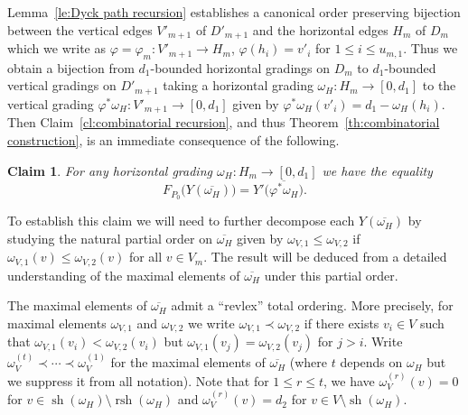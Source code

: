\documentclass{amsart}
\newtheorem{claim}[theorem]{Claim}
\newcommand{\rsh}{\operatorname{rsh}}
\newcommand{\sh}{\operatorname{sh}}
\begin{document}
Lemma~\ref{le:Dyck path recursion} establishes a canonical order preserving bijection between the vertical edges $V'_{m+1}$ of $D'_{m+1}$ and the horizontal edges $H_m$ of $D_m$ which we write as $\varphi=\varphi_m:V'_{m+1}\to H_m$, $\varphi(h_i)=v'_i$ for $1\le i\le u_{m,1}$.  Thus we obtain a bijection from $d_1$-bounded horizontal gradings on $D_m$ to $d_1$-bounded vertical gradings on $D'_{m+1}$ taking a horizontal grading $\omega_H:H_m\to[0,d_1]$ to the vertical grading $\varphi^*\omega_H:V'_{m+1}\to[0,d_1]$ given by $\varphi^*\omega_H(v'_i)=d_1-\omega_H(h_i)$.  Then Claim~\ref{cl:combinatorial recursion}, and thus Theorem~\ref{th:combinatorial construction}, is an immediate consequence of the following.
\begin{claim}\label{cl:horizontal to vertical}
  For any horizontal grading $\omega_H:H_m\to[0,d_1]$ we have the equality
  \begin{equation}\label{eq:horizontal to vertical}
    F_{P_0}\big(Y(\overline{\omega_H})\big)=Y'\big(\overline{\varphi^*\omega_H}\big).
  \end{equation}
\end{claim}
To establish this claim we will need to further decompose each $Y(\overline{\omega_H})$ by studying the natural partial order on $\overline{\omega_H}$ given by $\omega_{V,1}\le\omega_{V,2}$ if $\omega_{V,1}(v)\le\omega_{V,2}(v)$ for all $v\in V_m$.  The result will be deduced from a detailed understanding of the maximal elements of $\overline{\omega_H}$ under this partial order.  

The maximal elements of $\overline{\omega_H}$ admit a ``revlex'' total ordering.  More precisely, for maximal elements $\omega_{V,1}$ and $\omega_{V,2}$ we write $\omega_{V,1}\prec\omega_{V,2}$ if there exists $v_i\in V$ such that $\omega_{V,1}(v_i)<\omega_{V,2}(v_i)$ but $\omega_{V,1}(v_j)=\omega_{V,2}(v_j)$ for $j>i$.  Write $\omega_V^{(t)}\prec\cdots\prec\omega_V^{(1)}$ for the maximal elements of $\overline{\omega_H}$ (where $t$ depends on $\omega_H$ but we suppress it from all notation).  Note that for $1\le r\le t$, we have $\omega_V^{(r)}(v)=0$ for $v\in\sh(\omega_H)\setminus\rsh(\omega_H)$ and $\omega_V^{(r)}(v)=d_2$ for $v\in V\setminus\sh(\omega_H)$.  
\end{document}
